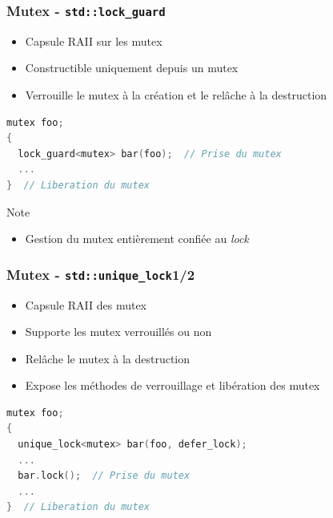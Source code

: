 \documentclass[C++.tex]{subfiles}
\begin{document}
\begin{frame}[fragile]
	\frametitle{Mutex - \lstinline|std::lock_guard|}
	\begin{itemize}
		\item Capsule RAII sur les mutex
		\item Constructible uniquement depuis un mutex
		\item Verrouille le mutex à la création et le relâche à la destruction
	\end{itemize}

	\begin{lstlisting}[language=C++]
mutex foo;
{
  lock_guard<mutex> bar(foo);  // Prise du mutex
  ...
}  // Liberation du mutex\end{lstlisting}

	\pause

	\begin{block}{Note}
		\begin{itemize}
			\item Gestion du mutex entièrement confiée au \textit{lock}
		\end{itemize}
	\end{block}
\end{frame}

\begin{frame}[fragile]
	\frametitle{Mutex - \lstinline|std::unique_lock|\titlehfill{}1/2}
	\begin{itemize}
		\item Capsule RAII des mutex
		\item Supporte les mutex verrouillés ou non
		\item Relâche le mutex à la destruction
		\item Expose les méthodes de verrouillage et libération des mutex
	\end{itemize}

	\begin{lstlisting}[language=C++]
mutex foo;
{
  unique_lock<mutex> bar(foo, defer_lock);
  ...
  bar.lock();  // Prise du mutex
  ...
}  // Liberation du mutex\end{lstlisting}
\end{frame}
\end{document}
